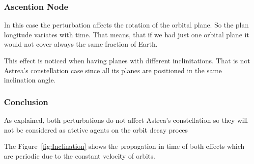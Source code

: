 \subsubsection{Ascention Node}

In this case the perturbation affects the rotation of the orbital plane. So the plan longitude variates with time. That means, that if we had just one orbital plane it would not cover always the same fraction of Earth.

This effect is noticed when having planes with different inclinitations. That is not Astrea's constellation case since all its planes are positioned in the same inclination angle.


\subsubsection{Conclusion}

As explained, both perturbations do not affect Astrea's constellation so they will not be considered as atctive agents on the orbit decay proces

The Figure~\ref{fig:Inclination} shows the propagation in time of both effects which are periodic due to the constant velocity  of orbits.




